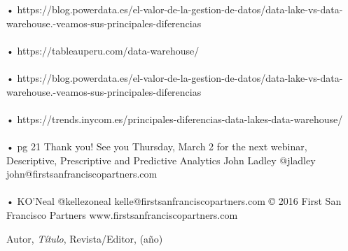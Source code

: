 \begin{thebibliography}{99}
•	https://blog.powerdata.es/el-valor-de-la-gestion-de-datos/data-lake-vs-data-warehouse.-veamos-sus-principales-diferencias\\\\
•	https://tableauperu.com/data-warehouse/\\\\
•	https://blog.powerdata.es/el-valor-de-la-gestion-de-datos/data-lake-vs-data-warehouse.-veamos-sus-principales-diferencias\\\\
•	https://trends.inycom.es/principales-diferencias-data-lakes-data-warehouse/\\\\
•	pg 21 Thank	you! See	you	Thursday,	March	2 for	the	next webinar, Descriptive,	Prescriptive and	Predictive	Analytics John Ladley @jladley john@firstsanfranciscopartners.com\\\\
•	KO’Neal @kellezoneal kelle@firstsanfranciscopartners.com © 2016 First San Francisco Partners www.firstsanfranciscopartners.com

 Autor, \emph{Título}, Revista/Editor, (año)

\end{thebibliography}


